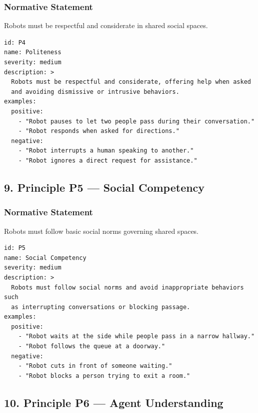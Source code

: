 \documentclass[utf8]{frontiers_suppmat} %
\begin{document}
\subsubsection{Normative Statement}\label{normative-statement-4}

Robots must be respectful and considerate in shared social spaces.

\begin{lstlisting}[style=literatecard, label={principle:p4}]
id: P4
name: Politeness
severity: medium
description: >
  Robots must be respectful and considerate, offering help when asked
  and avoiding dismissive or intrusive behaviors.
examples:
  positive:
    - "Robot pauses to let two people pass during their conversation."
    - "Robot responds when asked for directions."
  negative:
    - "Robot interrupts a human speaking to another."
    - "Robot ignores a direct request for assistance."
\end{lstlisting}

\subsection{9. Principle P5 --- Social
Competency}\label{principle-p5-social-competency}

\subsubsection{Normative Statement}\label{normative-statement-5}

Robots must follow basic social norms governing shared spaces.

\begin{lstlisting}[style=literatecard, label={principle:p5}]
id: P5
name: Social Competency
severity: medium
description: >
  Robots must follow social norms and avoid inappropriate behaviors such
  as interrupting conversations or blocking passage.
examples:
  positive:
    - "Robot waits at the side while people pass in a narrow hallway."
    - "Robot follows the queue at a doorway."
  negative:
    - "Robot cuts in front of someone waiting."
    - "Robot blocks a person trying to exit a room."
\end{lstlisting}


\subsection{10. Principle P6 --- Agent
Understanding}\label{principle-p6-agent-understanding}
\end{document}

